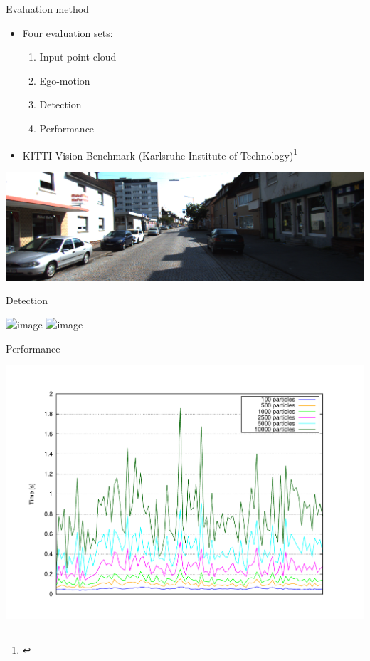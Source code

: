 \begin{frame}{Evaluation method}
  \begin{itemize}
   \item Four evaluation sets:
   \begin{enumerate}
    \item Input point cloud
    \item Ego-motion
    \item Detection
    \item Performance
   \end{enumerate}
   \item KITTI Vision Benchmark (Karlsruhe Institute of Technology)\footnote{\cite{geiger2013vision}}
  \end{itemize}
  \begin{center}
    \includegraphics[height=0.4\textheight]{kitti}
  \end{center}
\end{frame}

\begin{frame}[plain]{Detection}
  \begin{center}
    \includegraphics<1>[height=1.1\textheight,trim=50 40 80 60,clip]{recall}
    \includegraphics<2>[height=1.1\textheight,trim=50 40 80 60,clip]{precision}
  \end{center}
\end{frame}

\begin{frame}[plain]{Performance}
  \begin{center}
    \includegraphics[height=1.1\textheight,trim=50 50 90 60, clip]{timesVsParticles}
  \end{center}
\end{frame}

